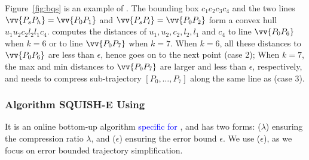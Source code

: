 \begin{example}
	\label{exm-alg-bqs}
	Figure~\ref{fig:bqs} is an example of \bqsa. The bounding box $c_1c_2c_3c_4$ and the two lines $\vv{P_sP_{h}} = \vv{P_0P_1}$ and $\vv{P_sP_{l}} = \vv{P_0P_2}$ form a convex hull $u_1u_2c_2l_2l_1c_4$. \bqsa computes the distances of $u_1,u_2,c_2,l_2,l_1$ and $c_4$ to line $\vv{P_0P_6}$ when $k=6$ or to line $\vv{P_0P_7}$ when $k=7$.
	When $k=6$, all these distances to $\vv{P_0P_6}$  are less than $\epsilon$, hence \bqsa goes on to the next point (case 2); When $k=7$,
	the max and min distances to $\vv{P_0P_7}$ are larger and less than $\epsilon$, respectively, and \bqsa needs to compress sub-trajectory $[P_0, \ldots, P_7]$ along the same line as \dpa (case 3).
\end{example}




\subsubsection{Algorithm SQUISH-E Using \sed~\cite{Muckell:Compression}}
It is an online bottom-up algorithm \textcolor{blue}{specific for \sed}, and has two forms: \squishe($\lambda$) ensuring the compression ratio $\lambda$, and \squishe($\epsilon$) ensuring the \sed error bound $\epsilon$. We use \squishe($\epsilon$), as we focus on error bounded trajectory simplification.


